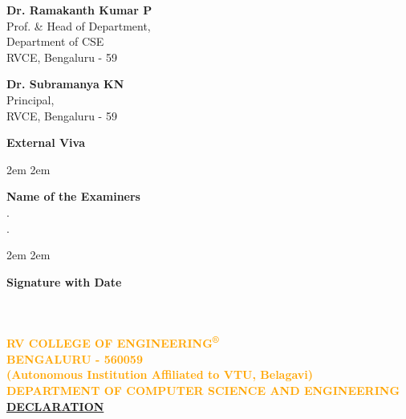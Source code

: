 \begin{center}

	\bigskip
	\begin{multicols}{2}

		\small \textbf{Dr. Ramakanth Kumar P}
		\small{
			\\Prof. \& Head of Department,
			\\Department of CSE
			\\RVCE, Bengaluru - 59
		}\\

		\columnbreak

		\small  \textbf{Dr. Subramanya KN}
		\small{
			\\Principal,
			\\RVCE, Bengaluru - 59
		}\\
	\end{multicols}


	\bigskip
	\bigskip
	\large \textbf{External Viva}
	\begin{multicols}{2}

		\begingroup
			\leftskip2em
			\rightskip2em

			\normalsize \textbf{Name of the Examiners}
			\\
			. \hrulefill\\
			. \hrulefill\\

		\endgroup

		\columnbreak

		\begingroup
			\leftskip2em
			\rightskip2em

			\normalsize \textbf{Signature with Date} \\
			\bigskip
			\hrulefill\\
			\bigskip
			\hrulefill\\
		\endgroup


	\end{multicols}
\end{center}


\newpage


\begin{center}
	\textbf {
		\textcolor{orange}{
			\large RV COLLEGE OF ENGINEERING\textsuperscript{®}\\
			\large BENGALURU - 560059\\
			\small(Autonomous Institution Affiliated to VTU, Belagavi)\\[1cm]
			\normalsize DEPARTMENT OF COMPUTER SCIENCE AND ENGINEERING\\
		}
	}
	\bigskip \bigskip
	\Large \textbf{\underline {DECLARATION}}\\[1cm]
\end{center}

